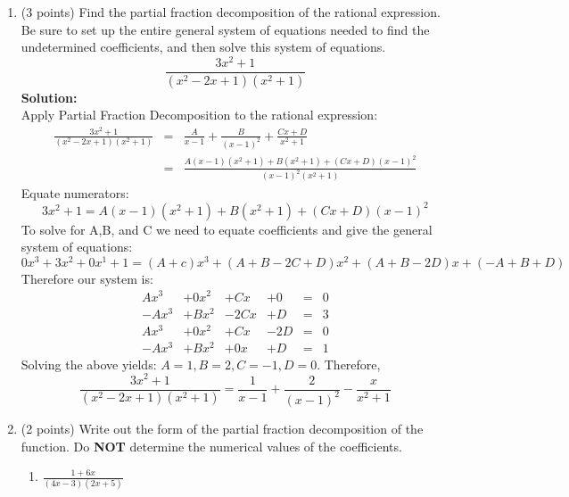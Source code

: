 \documentclass[paper=a4, fontsize=11pt]{scrartcl} %
\numberwithin{equation}{section} %
\numberwithin{figure}{section} %
\numberwithin{table}{section} %
\begin{document}
\begin{enumerate}
\item (3 points) Find the partial fraction decomposition of the rational expression.  Be sure to set up the entire general system of equations needed to find the undetermined coefficients, and then solve this system of equations.\\
\begin{equation*}
\frac{3x^2+1}{(x^2-2x+1)(x^2+1)}
\end{equation*}
\noindent\textbf{Solution:}\\
Apply Partial Fraction Decomposition to the rational expression:
\begin{eqnarray*}
\frac{3x^2+1}{(x^2-2x+1)(x^2+1)}&=&\frac{A}{x-1}+\frac{B}{(x-1)^2}+\frac{Cx+D}{x^2+1} \\
&=&\frac{A(x-1)(x^2+1)+B(x^2+1)+(Cx+D)(x-1)^2}{(x-1)^2(x^2+1)}
\end{eqnarray*}
Equate numerators:
\begin{equation*}
3x^2+1=A(x-1)(x^2+1)+B(x^2+1)+(Cx+D)(x-1)^2
\end{equation*}
To solve for A,B, and C we need to equate coefficients and give the general system of equations:
\begin{equation*}
0x^3+3x^2+0x^1+1=
(A+c)x^3+(A+B-2C+D)x^2+(A+B-2D)x+(-A+B+D)
\end{equation*}
Therefore our system is:
\[ \begin{array}{cccccc}
Ax^3 & +0x^2 & +Cx & +0 &=& 0\\
-Ax^3 & +Bx^2 & -2Cx & +D &=& 3 \\
Ax^3 & +0x^2 & +Cx & -2D &=& 0\\
-Ax^3 & +Bx^2 & +0x & +D &=& 1 \end{array} \]  
Solving the above yields:
$A=1,B=2,C=-1,D=0$.
Therefore,
\begin{equation*}
\frac{3x^2+1}{(x^2-2x+1)(x^2+1)}=\frac{1}{x-1}+\frac{2}{(x-1)^2}-\frac{x}{x^2+1}
\end{equation*}

\newpage

\item (2 points) Write out the form of the partial fraction decomposition of the function.  Do \textbf{NOT} determine the numerical values of the coefficients. 
\begin{enumerate}
\item \begin{large}$\frac{1+6x}{(4x-3)(2x+5)}$\end{large}\\


\end{enumerate}
\end{enumerate}
\end{document}
